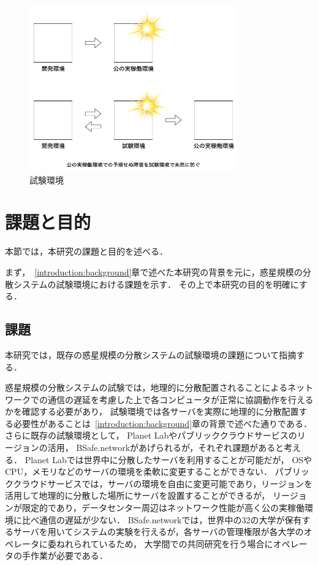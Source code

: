 \begin{figure}[htbp]
  \begin{center}
    \includegraphics[width=0.8\textwidth]{./figures/staging.jpg}
    \caption{試験環境}
  \end{center}
\end{figure}

\section{課題と目的}
\label{introduction:issue-aim}

本節では，本研究の課題と目的を述べる．

まず，~\ref{introduction:background}章で述べた本研究の背景を元に，惑星規模の分散システムの試験環境における課題を示す．
その上で本研究の目的を明確にする．

\subsection{課題}
\label{introduction:issue-aim:issue}

本研究では，既存の惑星規模の分散システムの試験環境の課題について指摘する．

惑星規模の分散システムの試験では，地理的に分散配置されることによるネットワークでの通信の遅延を考慮した上で各コンピュータが正常に協調動作を行えるかを確認する必要があり，
試験環境では各サーバを実際に地理的に分散配置する必要性があることは~\ref{introduction:background}章の背景で述べた通りである．
さらに既存の試験環境として， Planet Labやパブリッククラウドサービスのリージョンの活用， BSafe.networkがあげられるが，それぞれ課題があると考える．
Planet Labでは世界中に分散したサーバを利用することが可能だが， OSやCPU，メモリなどのサーバの環境を柔軟に変更することができない．
パブリッククラウドサービスでは，サーバの環境を自由に変更可能であり，リージョンを活用して地理的に分散した場所にサーバを設置することができるが，
リージョンが限定的であり，データセンター周辺はネットワーク性能が高く公の実稼働環境に比べ通信の遅延が少ない．
BSafe.networkでは，世界中の32の大学が保有するサーバを用いてシステムの実験を行えるが，各サーバの管理権限が各大学のオペレータに委ねれられているため，
大学間での共同研究を行う場合にオペレータの手作業が必要である．

